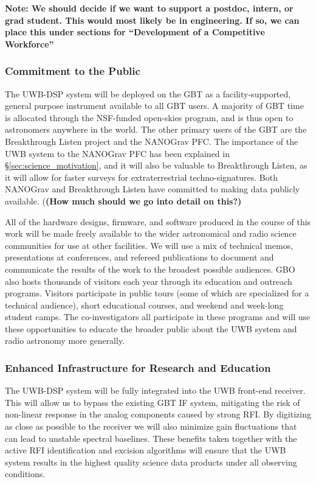 \documentclass[10pt]{myNSF}
\begin{document}
\textbf{Note: We should decide if we want to support a postdoc,
  intern, or grad student.  This would most likely be in engineering.
  If so, we can place this under sections for ``Development of a
  Competitive Workforce''}

\subsubsection{Commitment to the Public}
\label{sec:commitment}

The UWB-DSP system will be deployed on the GBT as a
facility-supported, general purpose instrument available to all GBT
users.  A majority of GBT time is allocated through the NSF-funded
open-skies program, and is thus open to astronomers anywhere in the
world.  The other primary users of the GBT are the Breakthrough Listen
project and the NANOGrav PFC.  The importance of the UWB system to the
NANOGrav PFC has been explained in \S\ref{sec:science_motivation}, and
it will also be valuable to Breakthrough Listen, as it will allow for
faster surveys for extraterrestrial techno-signatures.  Both NANOGrav
and Breakthrough Listen have committed to making data publicly
available. (\textbf{(How much should we go into detail on this?)}

All of the hardware designs, firmware, and software produced in the
course of this work will be made freely available to the wider
astronomical and radio science communities for use at other
facilities.  We will use a mix of technical memos, presentations at
conferences, and refereed publications to document and communicate the
results of the work to the broadest possible audiences.  GBO also
hosts thousands of visitors each year through its education and
outreach programs.  Visitors participate in public tours (some of
which are specialized for a technical audience), short educational
courses, and weekend and week-long student camps.  The
co-investigators all participate in these programs and will use these
opportunities to educate the broader public about the UWB system and
radio astronomy more generally.

\subsubsection{Enhanced Infrastructure for Research and Education}
\label{sec:infrastructure}


The UWB-DSP system will be fully integrated into the UWB front-end
receiver.  This will allow us to bypass the existing GBT IF system,
mitigating the risk of non-linear response in the analog components
caused by strong RFI.  By digitizing as close as possible to the
receiver we will also minimize gain fluctuations that can lead to
unstable spectral baselines.  These benefits taken together with the
active RFI identification and excision algorithms will ensure that the
UWB system results in the highest quality science data products under
all observing conditions.
\end{document}
